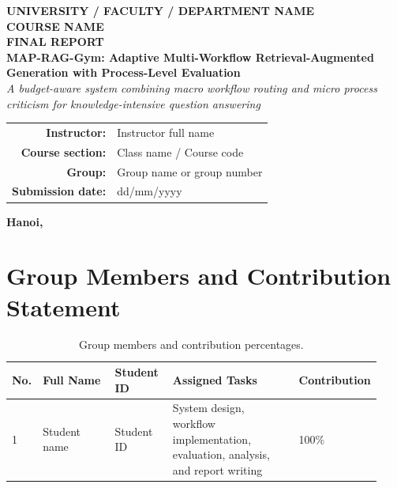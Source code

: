 \documentclass[12pt,a4paper]{article}
\begin{document}
\begin{titlepage}
    \centering
    \vspace*{0.5cm}
    {\Large \textbf{UNIVERSITY / FACULTY / DEPARTMENT NAME}}\\[0.3cm]
    {\large \textbf{COURSE NAME}}\\[1.5cm]

    {\Huge \textbf{FINAL REPORT}}\\[0.7cm]
    {\LARGE \textbf{MAP-RAG-Gym: Adaptive Multi-Workflow Retrieval-Augmented Generation with Process-Level Evaluation}}\\[0.8cm]
    {\large \textit{A budget-aware system combining macro workflow routing and micro process criticism for knowledge-intensive question answering}}\\[1.5cm]

    \begin{tabular}{rl}
        \textbf{Instructor:} & Instructor full name \\
        \textbf{Course section:} & Class name / Course code \\
        \textbf{Group:} & Group name or group number \\
        \textbf{Submission date:} & dd/mm/yyyy \\
    \end{tabular}

    \vfill
    {\large \textbf{Hanoi, \the\year}}
\end{titlepage}

\section*{Group Members and Contribution Statement}

\begin{table}[H]
\centering
\small
\caption{Group members and contribution percentages.}
\label{tab:member_contribution}
\begin{tabular}{p{0.05\linewidth}p{0.22\linewidth}p{0.16\linewidth}p{0.38\linewidth}p{0.12\linewidth}}
\toprule
\textbf{No.} & \textbf{Full Name} & \textbf{Student ID} & \textbf{Assigned Tasks} & \textbf{Contribution} \\
\midrule
1 & Student name & Student ID & System design, workflow implementation, evaluation, analysis, and report writing & 100\% \\
\bottomrule
\end{tabular}
\end{table}
\end{document}
